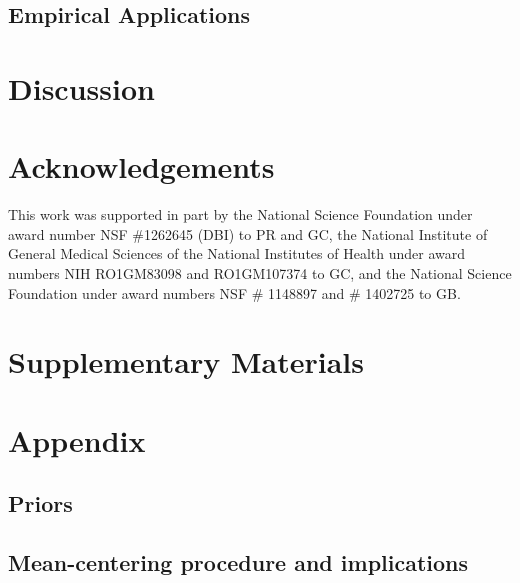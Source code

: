 \documentclass[12pt]{article}
\begin{document}
\subsection*{Empirical Applications}

\section*{Discussion}

\section*{Acknowledgements}

This work was supported in part by 
the National Science Foundation under award number NSF \#1262645 (DBI) to PR and GC, 
the National Institute of General Medical Sciences of the National Institutes of Health under award numbers NIH RO1GM83098 and RO1GM107374 to GC,
and the National Science Foundation under award numbers NSF \# 1148897 and \# 1402725 to GB.


\newpage



\newpage

\section*{Supplementary Materials}
\renewcommand{\thefigure}{S\arabic{figure}}
\setcounter{figure}{0}
\renewcommand{\thetable}{S\arabic{table}}
\setcounter{table}{0}
\renewcommand{\theequation}{S\arabic{table}}
\setcounter{equation}{0}

\section{Appendix}
\subsection{Priors}
\subsection{Mean-centering procedure and implications}
\end{document}
